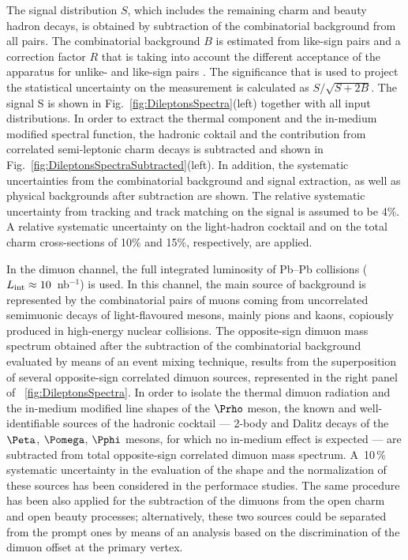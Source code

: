 \documentclass[../report.tex]{subfiles}
\begin{document}
The signal distribution $S$, which includes the remaining charm and beauty hadron decays, is obtained by subtraction of the combinatorial background from all \Pepem pairs. The combinatorial background $B$ is estimated from like-sign pairs and a correction factor $R$ that is taking into account the different acceptance of the apparatus for unlike- and like-sign pairs \cite{allLMeePapersRun1and2}. The significance that is used to project the statistical uncertainty on the measurement is calculated as $S/\sqrt{S+2B}$. The signal S is shown in Fig.~\ref{fig:DileptonsSpectra}(left) together with all input distributions. In order to extract the thermal component and the in-medium modified \Prho spectral function, the hadronic coktail and the contribution from correlated semi-leptonic charm decays is subtracted and shown in Fig.~\ref{fig:DileptonsSpectraSubtracted}(left). In addition, the systematic uncertainties from the combinatorial background and signal extraction, as well as physical backgrounds after subtraction are shown. The relative systematic uncertainty from tracking and track matching on the signal is assumed to be 4\%.  A relative systematic uncertainty on the light-hadron cocktail and on the total charm cross-sections of 10\% and 15\%, respectively, are applied.

In the dimuon channel, the full integrated luminosity of Pb--Pb collisions ($L_{\rm int}\approx 10$~nb$^{−1}$) is used. In this channel, the main source of background is represented by the combinatorial pairs of muons coming from uncorrelated semimuonic decays of light-flavoured mesons, mainly pions and kaons, copiously produced in high-energy nuclear collisions. The opposite-sign dimuon mass spectrum obtained after the subtraction of the combinatorial background evaluated by means of an event mixing technique, results from the superposition of several opposite-sign correlated dimuon sources, represented in the right panel of \figurename~\ref{fig:DileptonsSpectra}. In order to isolate the thermal dimuon radiation and the in-medium modified line shapes of the $\Prho$ meson, the known and well-identifiable sources of the hadronic cocktail --- 2-body and Dalitz decays of the $\Peta$, $\Pomega$, $\Pphi$ mesons, for which no in-medium effect is expected --- are subtracted from total opposite-sign correlated dimuon mass spectrum. A~10\,\% systematic uncertainty in the evaluation of the shape and the normalization of these sources has been considered in the performace studies. The same procedure has been also applied for the subtraction of the dimuons from the open charm and open beauty processes; alternatively, these two sources could be separated from the prompt ones by means of an analysis based on the discrimination of the dimuon offset at the primary vertex.
\end{document}
